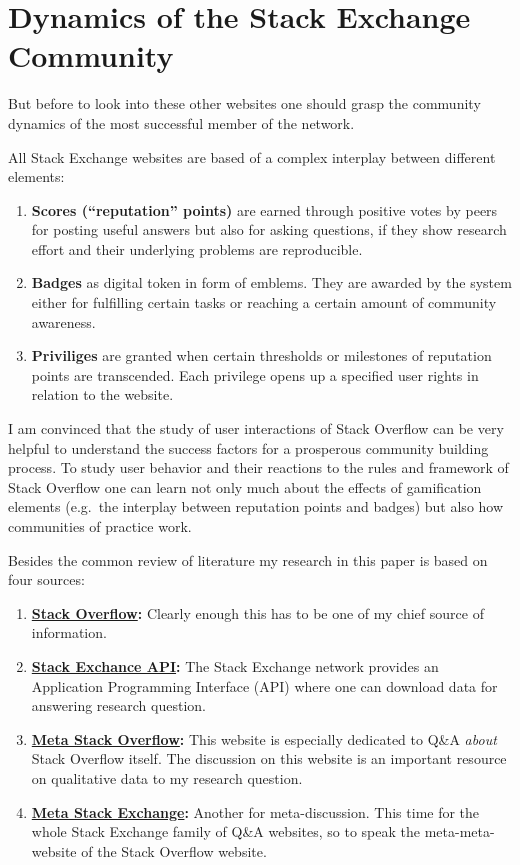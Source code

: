 \documentclass[]{book}
\providecommand{\tightlist}{%
  \setlength{\itemsep}{0pt}\setlength{\parskip}{0pt}}
\theoremstyle{definition}
\theoremstyle{definition}
\theoremstyle{definition}
\theoremstyle{remark}
\begin{document}
\section{Dynamics of the Stack Exchange
Community}\label{dynamics-of-the-stack-exchange-community}

But before to look into these other websites one should grasp the
community dynamics of the most successful member of the network.

All Stack Exchange websites are based of a complex interplay between
different elements:

\begin{enumerate}
\def\labelenumi{\arabic{enumi}.}
\tightlist
\item
  \textbf{Scores (``reputation'' points)} are earned through positive
  votes by peers for posting useful answers but also for asking
  questions, if they show research effort and their underlying problems
  are reproducible.
\item
  \textbf{Badges} as digital token in form of emblems. They are awarded
  by the system either for fulfilling certain tasks or reaching a
  certain amount of community awareness.
\item
  \textbf{Priviliges} are granted when certain thresholds or milestones
  of reputation points are transcended. Each privilege opens up a
  specified user rights in relation to the website.
\end{enumerate}

I am convinced that the study of user interactions of Stack Overflow can
be very helpful to understand the success factors for a prosperous
community building process. To study user behavior and their reactions
to the rules and framework of Stack Overflow one can learn not only much
about the effects of gamification elements (e.g.~the interplay between
reputation points and badges) but also how communities of practice work.

Besides the common review of literature my research in this paper is
based on four sources:

\begin{enumerate}
\def\labelenumi{\arabic{enumi}.}
\tightlist
\item
  \textbf{\href{https://stackoverflow.com/}{Stack Overflow}:} Clearly
  enough this has to be one of my chief source of information.
\item
  \textbf{\href{http://api.stackexchange.com/}{Stack Exchance API}:} The
  Stack Exchange network provides an Application Programming Interface
  (API) where one can download data for answering research question.
\item
  \textbf{\href{https://meta.stackoverflow.com/}{Meta Stack Overflow}:}
  This website is especially dedicated to Q\&A \emph{about} Stack
  Overflow itself. The discussion on this website is an important
  resource on qualitative data to my research question.
\item
  \textbf{\href{https://meta.stackexchange.com/}{Meta Stack Exchange}:}
  Another for meta-discussion. This time for the whole Stack Exchange
  family of Q\&A websites, so to speak the meta-meta-website of the
  Stack Overflow website.
\end{enumerate}
\end{document}
